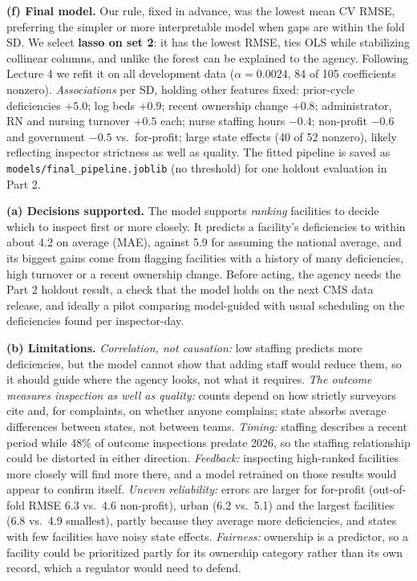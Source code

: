 \documentclass[11pt]{article}
\makeatletter
\renewcommand\section{\@startsection{section}{1}{\z@}{-1.6ex \@plus -.5ex \@minus -.2ex}{0.8ex \@plus .2ex}{\normalfont\large\bfseries}}
\makeatother
\begin{document}
\textbf{(f) Final model.} Our rule, fixed in advance, was the lowest mean CV RMSE, preferring the simpler or more interpretable model when gaps are within the fold SD. We select \textbf{lasso on set 2}: it has the lowest RMSE, ties OLS while stabilizing collinear columns, and unlike the forest can be explained to the agency. Following Lecture 4 we refit it on all development data ($\alpha=0.0024$, 84 of 105 coefficients nonzero). \emph{Associations} per SD, holding other features fixed: prior-cycle deficiencies $+5.0$; log beds $+0.9$; recent ownership change $+0.8$; administrator, RN and nursing turnover $+0.5$ each; nurse staffing hours $-0.4$; non-profit $-0.6$ and government $-0.5$ vs.\ for-profit; large state effects (40 of 52 nonzero), likely reflecting inspector strictness as well as quality. The fitted pipeline is saved as \texttt{models/final\_pipeline.joblib} (no threshold) for one holdout evaluation in Part 2.

\section{Stakeholder guidance}
\textbf{(a) Decisions supported.} The model supports \emph{ranking} facilities to decide which to inspect first or more closely. It predicts a facility's deficiencies to within about 4.2 on average (MAE), against 5.9 for assuming the national average, and its biggest gains come from flagging facilities with a history of many deficiencies, high turnover or a recent ownership change. Before acting, the agency needs the Part 2 holdout result, a check that the model holds on the next CMS data release, and ideally a pilot comparing model-guided with usual scheduling on the deficiencies found per inspector-day.

\textbf{(b) Limitations.} \emph{Correlation, not causation:} low staffing predicts more deficiencies, but the model cannot show that adding staff would reduce them, so it should guide where the agency looks, not what it requires. \emph{The outcome measures inspection as well as quality:} counts depend on how strictly surveyors cite and, for complaints, on whether anyone complains; state absorbs average differences between states, not between teams. \emph{Timing:} staffing describes a recent period while 48\% of outcome inspections predate 2026, so the staffing relationship could be distorted in either direction. \emph{Feedback:} inspecting high-ranked facilities more closely will find more there, and a model retrained on those results would appear to confirm itself. \emph{Uneven reliability:} errors are larger for for-profit (out-of-fold RMSE 6.3 vs.\ 4.6 non-profit), urban (6.2 vs.\ 5.1) and the largest facilities (6.8 vs.\ 4.9 smallest), partly because they average more deficiencies, and states with few facilities have noisy state effects. \emph{Fairness:} ownership is a predictor, so a facility could be prioritized partly for its ownership category rather than its own record, which a regulator would need to defend.
\end{document}

